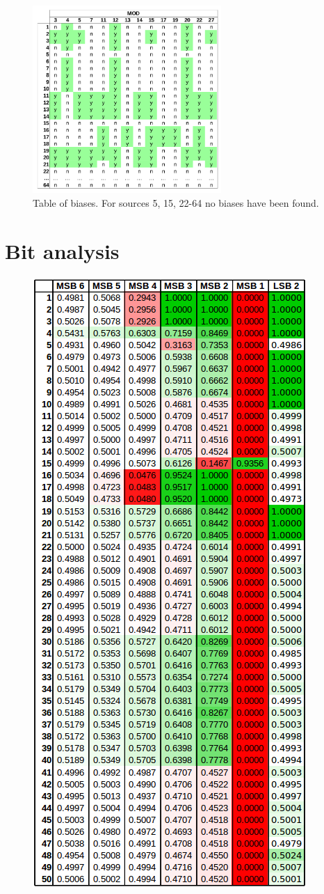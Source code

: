 \label{figure-mod-analysis}

\begin{figure}[ht]
\centering
\includegraphics[width=0.64\textwidth]{tex/images/mod_analysis}
\caption{Table of biases. For sources 5, 15, 22-64 no biases have been found.}
\vspace{4in}

\end{figure}

\clearpage

\section{Bit analysis}
\label{appendix-bit-analysis}

\begin{figure}[ht]
	\centering
	\includegraphics[width=0.47\linewidth]{tex/images/analysis/bit_sheet_1}
\end{figure}

